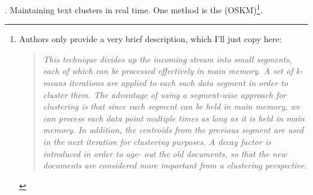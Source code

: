 \documentclass[11pt]{article}
\newcommand\p{\Needspace{10\baselineskip} \noindent}
\begin{document}
\p {}. Maintaining text clusters in real time. One method is the  (OSKM)\footnote{Authors only provide a very brief description, which I'll just copy here:
\vspace{-1em}
\begin{quote}
	{\tiny \textit{This technique
			divides up the incoming stream into small segments, each of which can
			be processed effectively in main memory. A set of k-means iterations
			are applied to each such data segment in order to cluster them. The
			advantage of using a segment-wise approach for clustering is that since
			each segment can be held in main memory, we can process each data
			point multiple times as long as it is held in main memory. In addition,
			the centroids from the previous segment are used in the next iteration
			for clustering purposes. A decay factor is introduced in order to age-
			out the old documents, so that the new documents are considered more
			important from a clustering perspective.} }
\end{quote}}.
\end{document}
